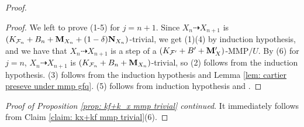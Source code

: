 \documentclass[11pt]{amsart}
\numberwithin{equation}{section}
\newcommand{\Mm}{{\bf{M}}}
\newcommand{\Nn}{{\bf{N}}}
\newcommand{\Ff}{\mathcal{F}}
\theoremstyle{definition}
\theoremstyle{definition}
\theoremstyle{definition}
\begin{document}
\begin{proof}
\begin{proof}
We left to prove (1-5) for $j=n+1$. Since $X_n\dashrightarrow X_{n+1}$ is $(K_{\Ff_n}+B_n+\Mm_{X_n}+(1-\delta)\Nn_{X_n})$-trivial, we get (1)(4) by induction hypothesis, and we have that $X_n\dashrightarrow X_{n+1}$ is a step of a $(K_{\Ff'}+B'+\Mm_X')$-MMP$/U$. By (6) for $j=n$, $X_n\dashrightarrow X_{n+1}$ is $(K_{\Ff_n}+B_n+\Mm_{X_n})$-trivial, so (2) follows from the induction hypothesis.  (3) follows from the induction hypothesis and Lemma \ref{lem: cartier preseve under mmp gfq}. (5) follows from induction hypothesis and \cite[Lemma 9.1.4]{CHLX23}.
\end{proof}

\noindent\textit{Proof of Proposition \ref{prop: kf+k_x mmp trivial} continued}. It immediately follows from Claim \ref{claim: kx+kf mmp trivial}(6).
\end{proof}
\end{document}
